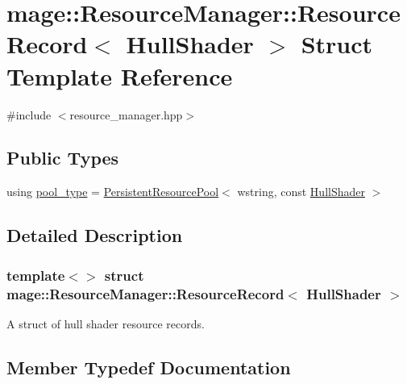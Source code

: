 \hypertarget{structmage_1_1_resource_manager_1_1_resource_record_3_01_hull_shader_01_4}{}\section{mage\+:\+:Resource\+Manager\+:\+:Resource\+Record$<$ Hull\+Shader $>$ Struct Template Reference}
\label{structmage_1_1_resource_manager_1_1_resource_record_3_01_hull_shader_01_4}


{\ttfamily \#include $<$resource\+\_\+manager.\+hpp$>$}

\subsection*{Public Types}
\begin{DoxyCompactItemize}
\item 
using \hyperlink{structmage_1_1_resource_manager_1_1_resource_record_3_01_hull_shader_01_4_a83933bb8aecb39aae446df88a5eb5869}{pool\+\_\+type} = \hyperlink{classmage_1_1_persistent_resource_pool}{Persistent\+Resource\+Pool}$<$ wstring, const \hyperlink{namespacemage_a964e5e384b0e55ac900c819da48b6000}{Hull\+Shader} $>$
\end{DoxyCompactItemize}


\subsection{Detailed Description}
\subsubsection*{template$<$$>$\newline
struct mage\+::\+Resource\+Manager\+::\+Resource\+Record$<$ Hull\+Shader $>$}

A struct of hull shader resource records. 

\subsection{Member Typedef Documentation}
\hypertarget{structmage_1_1_resource_manager_1_1_resource_record_3_01_hull_shader_01_4_a83933bb8aecb39aae446df88a5eb5869}{}\label{structmage_1_1_resource_manager_1_1_resource_record_3_01_hull_shader_01_4_a83933bb8aecb39aae446df88a5eb5869} 
